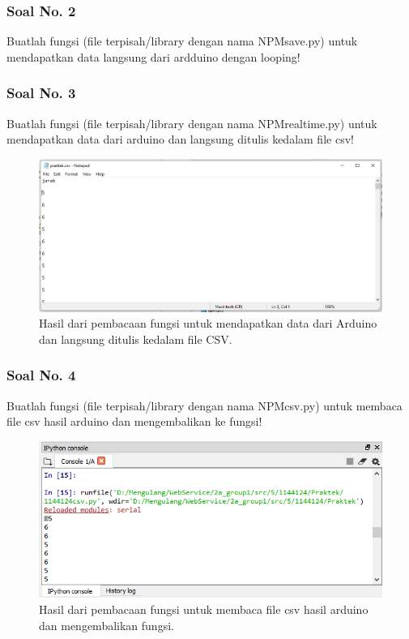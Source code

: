 \subsubsection{Soal No. 2}
Buatlah fungsi (file terpisah/library dengan nama NPMsave.py) untuk mendapatkan data langsung dari ardduino dengan looping!


\subsubsection{Soal No. 3}
Buatlah fungsi (file terpisah/library dengan nama NPMrealtime.py) untuk mendapatkan data dari arduino dan langsung ditulis kedalam file csv!


\begin{figure}[H]
	\includegraphics[width=12cm]{figures/5/1144124/Praktek/3.png}
	\centering
	\caption{Hasil dari pembacaan fungsi untuk mendapatkan data dari Arduino dan langsung ditulis kedalam file CSV.}
\end{figure}
\subsubsection{Soal No. 4}
Buatlah fungsi (file terpisah/library dengan nama NPMcsv.py) untuk membaca file csv hasil arduino dan mengembalikan ke fungsi!


\begin{figure}[H]
	\includegraphics[width=12cm]{figures/5/1144124/Praktek/csv.png}
	\centering
	\caption{Hasil dari pembacaan fungsi untuk membaca file csv hasil arduino dan mengembalikan fungsi.}
\end{figure}
